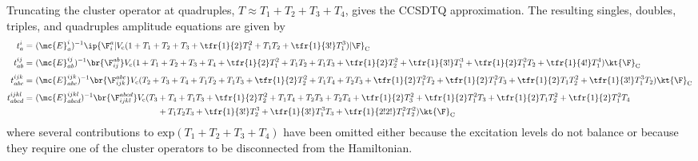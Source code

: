 \begin{ex}
Truncating the cluster operator at quadruples, $T\approx T_1 + T_2 + T_3 + T_4$, gives the CCSDTQ approximation.
The resulting singles, doubles, triples, and quadruples amplitude equations are given by\begin{align}
\nonumber
  t_a^i
=&\
  (\mc{E}_a^i)^{-1}
  \ip{\F_i^a|
    V_{\text{c}}
    (
      1
    +
      T_1
    +
      T_2
    +
      T_3
    +
      \tfr{1}{2}
      T_1^2
    +
      T_1T_2
    +
      \tfr{1}{3!}
      T_1^3
    )
  |\F}_{\text{C}}
\\[3pt]
\nonumber
  t_{ab}^{ij}
=&\
  (\mc{E}_{ab}^{ij})^{-1}
  \br{\F_{ij}^{ab}}
    V_{\text{c}}
    (
      1
    +
      T_1
    +
      T_2
    +
      T_3
    +
      T_4
    +
      \tfr{1}{2}
      T_1^2
    +
      T_1T_2
    +
      T_1T_3
    +
      \tfr{1}{2}
      T_2^2
    +
      \tfr{1}{3!}
      T_1^3
    +
      \tfr{1}{2}
      T_1^2T_2
    +
      \tfr{1}{4!}
      T_1^4
    )
  \kt{\F}_{\text{C}}
\\[3pt]
\nonumber
  t_{abc}^{ijk}
=&\
  (\mc{E}_{abc}^{ijk})^{-1}
  \br{\F_{ijk}^{abc}}
    V_{\text{c}}
    (
      T_2
    +
      T_3
    +
      T_4
    +
      T_1T_2
    +
      T_1T_3
    +
      \tfr{1}{2}
      T_2^2
    +
      T_1T_4
    +
      T_2T_3
    +
      \tfr{1}{2}
      T_1^2T_2
    +
      \tfr{1}{2}
      T_1^2T_3
    +
      \tfr{1}{2}
      T_1T_2^2
    +
      \tfr{1}{3!}
      T_1^3T_2
    )
  \kt{\F}_{\text{C}}
\\[3pt]
\nonumber
  t_{abcd}^{ijkl}
=&\
  (\mc{E}_{abcd}^{ijkl})^{-1}
  \br{\F_{ijkl}^{abcd}}
    V_{\text{c}}
    (
      T_3
    +
      T_4
    +
      T_1T_3
    +
      \tfr{1}{2}
      T_2^2
    +
      T_1T_4
    +
      T_2T_3
    +
      T_2T_4
    +
      \tfr{1}{2}
      T_3^2
    +
      \tfr{1}{2}
      T_1^2T_3
    +
      \tfr{1}{2}
      T_1T_2^2
    +
      \tfr{1}{2}
      T_1^2T_4
\\
\nonumber
&
\hphantom{
  (\mc{E}_{abcd}^{ijkl})^{-1}
  \br{\F_{ijkl}^{abcd}}
    V_{\text{c}}
    (
      T_3\
 }
    +
      T_1T_2T_3
    +
      \tfr{1}{3!}
      T_2^3
    +
      \tfr{1}{3!}
      T_1^3T_3
    +
      \tfr{1}{2!2!}
      T_1^2T_2^2
    )
  \kt{\F}_{\text{C}}
\end{align}
where several contributions to $\text{exp}(T_1+T_2+T_3+T_4)$ have been omitted either because the excitation levels do not balance or because they require one of the cluster operators to be disconnected from the Hamiltonian.
\end{ex}


